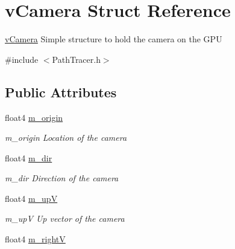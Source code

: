 \hypertarget{structvCamera}{\section{v\-Camera Struct Reference}
\label{structvCamera}
}


\hyperlink{structvCamera}{v\-Camera} Simple structure to hold the camera on the G\-P\-U  




{\ttfamily \#include $<$Path\-Tracer.\-h$>$}

\subsection*{Public Attributes}
\begin{DoxyCompactItemize}
\item 
\hypertarget{structvCamera_ab0b2fc7d0dbbea6b9eb3bbe9f28316fa}{float4 \hyperlink{structvCamera_ab0b2fc7d0dbbea6b9eb3bbe9f28316fa}{m\-\_\-origin}}\label{structvCamera_ab0b2fc7d0dbbea6b9eb3bbe9f28316fa}

\begin{DoxyCompactList}\small\item\em m\-\_\-origin Location of the camera \end{DoxyCompactList}\item 
\hypertarget{structvCamera_ad3792e67a6316c4c128df4713c35266d}{float4 \hyperlink{structvCamera_ad3792e67a6316c4c128df4713c35266d}{m\-\_\-dir}}\label{structvCamera_ad3792e67a6316c4c128df4713c35266d}

\begin{DoxyCompactList}\small\item\em m\-\_\-dir Direction of the camera \end{DoxyCompactList}\item 
\hypertarget{structvCamera_ad0a4bf049e26a87745cd803a7969d0f2}{float4 \hyperlink{structvCamera_ad0a4bf049e26a87745cd803a7969d0f2}{m\-\_\-up\-V}}\label{structvCamera_ad0a4bf049e26a87745cd803a7969d0f2}

\begin{DoxyCompactList}\small\item\em m\-\_\-up\-V Up vector of the camera \end{DoxyCompactList}\item 
\hypertarget{structvCamera_a6ebf14620a18b30cf24b017cc3ea001f}{float4 \hyperlink{structvCamera_a6ebf14620a18b30cf24b017cc3ea001f}{m\-\_\-right\-V}}\label{structvCamera_a6ebf14620a18b30cf24b017cc3ea001f}


\end{DoxyCompactItemize}
